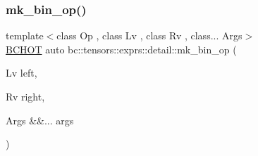 \subsubsection{\texorpdfstring{mk\+\_\+bin\+\_\+op()}{mk\_bin\_op()}}
{\footnotesize\ttfamily template$<$class Op , class Lv , class Rv , class... Args$>$ \\
\hyperlink{common_8h_ac085f07cc309e3aac24aa3fc0a40f6d2}{B\+C\+H\+OT} auto bc\+::tensors\+::exprs\+::detail\+::mk\+\_\+bin\+\_\+op (\begin{DoxyParamCaption}\item[{Lv}]{left,  }\item[{Rv}]{right,  }\item[{Args \&\&...}]{args }\end{DoxyParamCaption})}

